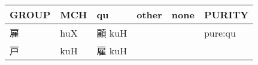 \documentclass[14pt,a4paper]{scrartcl}
\begin{document}
\begin{longtable}[c]{@{}llllll@{}}
\toprule
\begin{minipage}[b]{0.14\columnwidth}\raggedright\strut
GROUP
\strut\end{minipage} &
\begin{minipage}[b]{0.14\columnwidth}\raggedright\strut
MCH
\strut\end{minipage} &
\begin{minipage}[b]{0.14\columnwidth}\raggedright\strut
qu
\strut\end{minipage} &
\begin{minipage}[b]{0.14\columnwidth}\raggedright\strut
other
\strut\end{minipage} &
\begin{minipage}[b]{0.14\columnwidth}\raggedright\strut
none
\strut\end{minipage} &
\begin{minipage}[b]{0.14\columnwidth}\raggedright\strut
PURITY
\strut\end{minipage}\tabularnewline
\midrule
\endhead
\begin{minipage}[t]{0.14\columnwidth}\raggedright\strut
雇
\strut\end{minipage} &
\begin{minipage}[t]{0.14\columnwidth}\raggedright\strut
huX
\strut\end{minipage} &
\begin{minipage}[t]{0.14\columnwidth}\raggedright\strut
顧 kuH
\strut\end{minipage} &
\begin{minipage}[t]{0.14\columnwidth}\raggedright\strut
\strut\end{minipage} &
\begin{minipage}[t]{0.14\columnwidth}\raggedright\strut
\strut\end{minipage} &
\begin{minipage}[t]{0.14\columnwidth}\raggedright\strut
pure:qu
\strut\end{minipage}\tabularnewline
\begin{minipage}[t]{0.14\columnwidth}\raggedright\strut
戸
\strut\end{minipage} &
\begin{minipage}[t]{0.14\columnwidth}\raggedright\strut
kuH
\strut\end{minipage} &
\begin{minipage}[t]{0.14\columnwidth}\raggedright\strut
雇 kuH
\strut\end{minipage} &
\begin{minipage}[t]{0.14\columnwidth}\raggedright\strut

\end{minipage}
\end{longtable}
\end{document}
